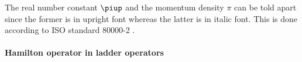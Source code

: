 \documentclass[11pt, english, fleqn, DIV=15, headinclude, BCOR=1cm]{scrartcl}
\begin{document}
\begin{small}
    The real number constant $\piup$ and the momentum density $\pi$ can be told
    apart since the former is in upright font whereas the latter is in italic
    font. This is done according to ISO standard 80000-2
    \parencite{iso_80000-2:2009}.
\end{small}

\paragraph{Hamilton operator in ladder operators}

\newcommand\Lad{a_{\vec p}^\dagger}
\newcommand\Lamd{a_{-\vec p}^\dagger}
\newcommand\Lam{a_{-\vec p}}
\newcommand\La{a_{\vec p}}
\newcommand\Lbd{b_{\vec p}^\dagger}
\newcommand\Lbmd{b_{-\vec p}^\dagger}
\newcommand\Lbm{b_{- \vec p}}
\newcommand\Lb{b_{\vec p}}
\end{document}
